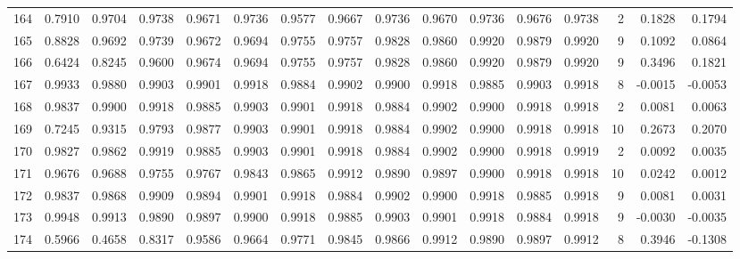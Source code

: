 \begin{tabular}{lrrrrrrrrrrrrrrr}
164 &      0.7910 &  0.9704 &  0.9738 &  0.9671 &  0.9736 &  0.9577 &  0.9667 &  0.9736 &  0.9670 &  0.9736 &   0.9676 &     0.9738 &      2 &                    0.1828 &                     0.1794 \\
165 &      0.8828 &  0.9692 &  0.9739 &  0.9672 &  0.9694 &  0.9755 &  0.9757 &  0.9828 &  0.9860 &  0.9920 &   0.9879 &     0.9920 &      9 &                    0.1092 &                     0.0864 \\
166 &      0.6424 &  0.8245 &  0.9600 &  0.9674 &  0.9694 &  0.9755 &  0.9757 &  0.9828 &  0.9860 &  0.9920 &   0.9879 &     0.9920 &      9 &                    0.3496 &                     0.1821 \\
167 &      0.9933 &  0.9880 &  0.9903 &  0.9901 &  0.9918 &  0.9884 &  0.9902 &  0.9900 &  0.9918 &  0.9885 &   0.9903 &     0.9918 &      8 &                   -0.0015 &                    -0.0053 \\
168 &      0.9837 &  0.9900 &  0.9918 &  0.9885 &  0.9903 &  0.9901 &  0.9918 &  0.9884 &  0.9902 &  0.9900 &   0.9918 &     0.9918 &      2 &                    0.0081 &                     0.0063 \\
169 &      0.7245 &  0.9315 &  0.9793 &  0.9877 &  0.9903 &  0.9901 &  0.9918 &  0.9884 &  0.9902 &  0.9900 &   0.9918 &     0.9918 &     10 &                    0.2673 &                     0.2070 \\
170 &      0.9827 &  0.9862 &  0.9919 &  0.9885 &  0.9903 &  0.9901 &  0.9918 &  0.9884 &  0.9902 &  0.9900 &   0.9918 &     0.9919 &      2 &                    0.0092 &                     0.0035 \\
171 &      0.9676 &  0.9688 &  0.9755 &  0.9767 &  0.9843 &  0.9865 &  0.9912 &  0.9890 &  0.9897 &  0.9900 &   0.9918 &     0.9918 &     10 &                    0.0242 &                     0.0012 \\
172 &      0.9837 &  0.9868 &  0.9909 &  0.9894 &  0.9901 &  0.9918 &  0.9884 &  0.9902 &  0.9900 &  0.9918 &   0.9885 &     0.9918 &      9 &                    0.0081 &                     0.0031 \\
173 &      0.9948 &  0.9913 &  0.9890 &  0.9897 &  0.9900 &  0.9918 &  0.9885 &  0.9903 &  0.9901 &  0.9918 &   0.9884 &     0.9918 &      9 &                   -0.0030 &                    -0.0035 \\
174 &      0.5966 &  0.4658 &  0.8317 &  0.9586 &  0.9664 &  0.9771 &  0.9845 &  0.9866 &  0.9912 &  0.9890 &   0.9897 &     0.9912 &      8 &                    0.3946 &                    -0.1308 \\

\end{tabular}
